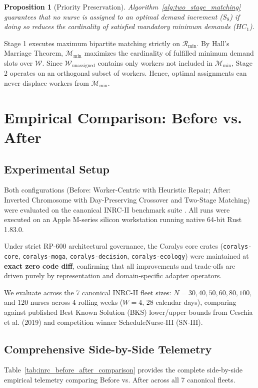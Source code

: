 \documentclass[10pt,journal,compsoc]{IEEEtran}
\newtheorem{proposition}{Proposition}
\newenvironment{proof}{\begin{IEEEproof}}{\end{IEEEproof}}
\begin{document}
\begin{proposition}[Priority Preservation]
Algorithm~\ref{alg:two_stage_matching} guarantees that no nurse is assigned to an optimal demand increment ($S_8$) if doing so reduces the cardinality of satisfied mandatory minimum demands ($HC_1$).
\end{proposition}

\begin{proof}
Stage 1 executes maximum bipartite matching strictly on $\mathcal{R}_{\min}$. By Hall's Marriage Theorem, $\mathcal{M}_{\min}$ maximizes the cardinality of fulfilled minimum demand slots over $\mathcal{W}$. Since $\mathcal{W}_{\text{unassigned}}$ contains only workers not included in $\mathcal{M}_{\min}$, Stage 2 operates on an orthogonal subset of workers. Hence, optimal assignments can never displace workers from $\mathcal{M}_{\min}$.
\end{proof}

\section{Empirical Comparison: Before vs. After}
\label{sec:experiments}

\subsection{Experimental Setup}
Both configurations (Before: Worker-Centric with Heuristic Repair; After: Inverted Chromosome with Day-Preserving Crossover and Two-Stage Matching) were evaluated on the canonical INRC-II benchmark suite \cite{ceschia2019second}. All runs were executed on an Apple M-series silicon workstation running native 64-bit Rust 1.83.0.

Under strict RP-600 architectural governance, the Coralys core crates (\texttt{coralys-core}, \texttt{coralys-moga}, \texttt{coralys-decision}, \texttt{coralys-ecology}) were maintained at \textbf{exact zero code diff}, confirming that all improvements and trade-offs are driven purely by representation and domain-specific adapter operators.

We evaluate across the 7 canonical INRC-II fleet sizes: $N = 30, 40, 50, 60, 80, 100,$ and $120$ nurses across 4 rolling weeks ($W = 4$, 28 calendar days), comparing against published Best Known Solution (BKS) lower/upper bounds from Ceschia et al. (2019) \cite{ceschia2019second} and competition winner ScheduleNurse-III (SN-III).

\subsection{Comprehensive Side-by-Side Telemetry}
Table~\ref{tab:inrc_before_after_comparison} provides the complete side-by-side empirical telemetry comparing Before vs. After across all 7 canonical fleets.
\end{document}
